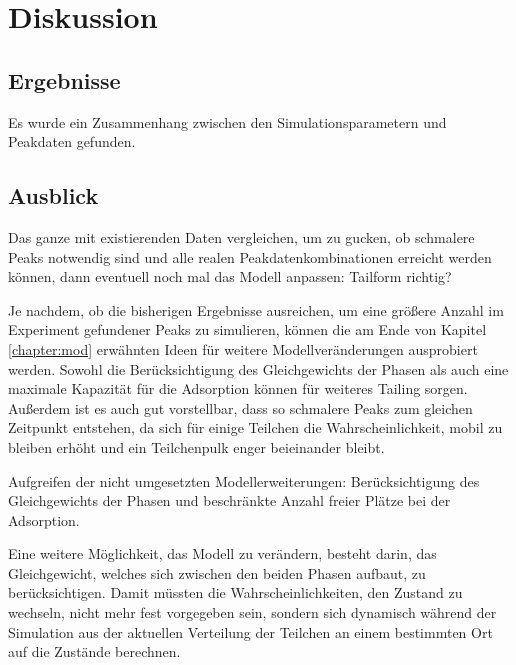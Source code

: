 \chapter{Diskussion}
\label{chapter:dis}

\section{Ergebnisse}
Es wurde ein Zusammenhang zwischen den Simulationsparametern und Peakdaten gefunden.


\section{Ausblick}

Das ganze mit existierenden Daten vergleichen, um zu gucken, ob schmalere Peaks notwendig sind und alle realen Peakdatenkombinationen erreicht werden können, dann eventuell noch mal das Modell anpassen:
Tailform richtig?

Je nachdem, ob die bisherigen Ergebnisse ausreichen, um eine größere Anzahl im Experiment gefundener Peaks zu simulieren, können die am Ende von Kapitel \ref{chapter:mod} erwähnten Ideen für weitere Modellveränderungen ausprobiert werden. Sowohl die Berücksichtigung des Gleichgewichts der Phasen als auch eine maximale Kapazität für die Adsorption können für weiteres Tailing sorgen. Außerdem ist es auch gut vorstellbar, dass so schmalere Peaks zum gleichen Zeitpunkt entstehen, da sich für einige Teilchen die Wahrscheinlichkeit, mobil zu bleiben erhöht und ein Teilchenpulk enger beieinander bleibt.

Aufgreifen der nicht umgesetzten Modellerweiterungen: Berücksichtigung des Gleichgewichts der Phasen und beschränkte Anzahl freier Plätze bei der Adsorption.

Eine weitere Möglichkeit, das Modell zu verändern, besteht darin, das Gleichgewicht, welches sich zwischen den beiden Phasen aufbaut, zu berücksichtigen. Damit müssten die Wahrscheinlichkeiten, den Zustand zu wechseln, nicht mehr fest vorgegeben sein, sondern sich dynamisch während der Simulation aus der aktuellen Verteilung der Teilchen an einem bestimmten Ort auf die Zustände berechnen.

